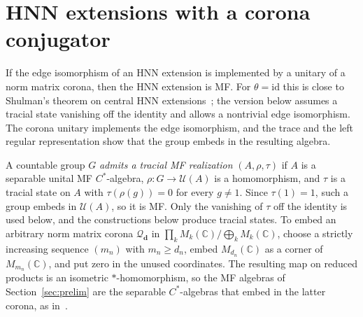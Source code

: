 \documentclass[11pt]{amsart}
\newcommand{\leanverified}[2]{\ignorespaces}
\theoremstyle{remark}
\theoremstyle{plain}
\newcommand{\C}{\mathbb C}
\newcommand{\U}{\mathcal U}
\begin{document}
\leanverified{Computability/MFRecognitionPi02}{GroupApproximation.MFRecognitionPi02.primrec_MFChecker}
\leanverified{Computability/MFRecognitionPi02}{GroupApproximation.MFRecognitionPi02.isOperatorMF_iff_forall_exists_MFChecker}
\leanverified{Computability/MFRecognitionPi02}{GroupApproximation.MFRecognitionPi02.operatorMFCode_pi02}
\leanverified{Computability/MFRecognitionPi02}{GroupApproximation.MFRecognitionPi02.nonOperatorMFCode_sigma02}

\section{HNN extensions with a corona conjugator}\label{sec:hnn}

If the edge isomorphism of an HNN extension is implemented by a unitary of
a norm matrix corona, then the HNN extension is MF\@.  For
$\theta=\mathrm{id}$ this is close to Shulman's theorem on central HNN
extensions~\cite{Shulman}; the version below assumes a tracial state
vanishing off the identity and allows a nontrivial edge isomorphism.  The
corona unitary implements the edge isomorphism, and the trace and the left
regular representation show that the group embeds in the resulting algebra.

A countable group $G$ \emph{admits a tracial MF realization}
$(A,\rho,\tau)$ if $A$ is a separable unital MF $C^*$-algebra,
$\rho\colon G\to\U(A)$ is a homomorphism, and $\tau$ is a tracial state on
$A$ with $\tau(\rho(g))=0$ for every $g\ne1$.  Since $\tau(1)=1$, such a
group embeds in $\U(A)$, so it is MF\@.  Only the vanishing of $\tau$
off the identity is used below, and the constructions below produce
tracial states.
\leanverified{Manuscript/OneSidedMFRadical/HNNCoronaConjugatorSentenceAudit}{GroupApproximation.Manuscript.OneSidedMFRadical.HNNCoronaConjugatorSentenceAudit.RegularRealizationData.rho_injective}
\leanverified{Manuscript/OneSidedMFRadical/HNNCoronaConjugatorSentenceAudit}{GroupApproximation.Manuscript.OneSidedMFRadical.HNNCoronaConjugatorSentenceAudit.RegularRealizationData.isOperatorMF}
To embed an arbitrary norm matrix corona $\mathcal Q_{\mathbf d}$ in
$\prod_kM_k(\C)/\bigoplus_kM_k(\C)$, choose a strictly increasing sequence
$(m_n)$ with $m_n\ge d_n$, embed $M_{d_n}(\C)$ as a corner of
$M_{m_n}(\C)$, and put zero in the unused coordinates.  The resulting map
on reduced products is an isometric $*$-homomorphism, so the MF algebras of
Section~\ref{sec:prelim} are the separable $C^*$-algebras that embed in the
latter corona, as in~\cite{BK,Shulman}.
\end{document}
